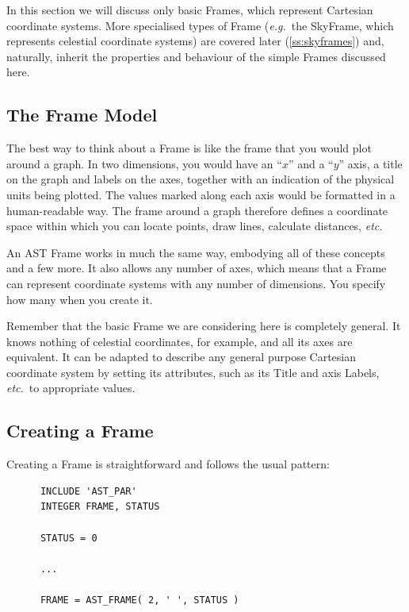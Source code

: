 \documentclass[twoside,11pt]{article}
\newcommand{\htmlref}[2]{#1}
\newcommand{\secref}[1]{\S\ref{#1}}
\renewcommand{\secref}[1]{\ref{#1}}
\begin{document}
In this section we will discuss only basic Frames, which represent
Cartesian coordinate systems. More specialised types of Frame
({\em{e.g.}}\ the \htmlref{SkyFrame}{SkyFrame}, which represents celestial coordinate
systems) are covered later (\secref{ss:skyframes}) and, naturally,
inherit the properties and behaviour of the simple Frames discussed
here.

\subsection{The Frame Model}

The best way to think about a \htmlref{Frame}{Frame} is like the frame that you would
plot around a graph. In two dimensions, you would have an ``$x$'' and
a ``$y$'' axis, a title on the graph and labels on the axes, together
with an indication of the physical units being plotted. The values
marked along each axis would be formatted in a human-readable way. The
frame around a graph therefore defines a coordinate space within which
you can locate points, draw lines, calculate distances, {\em{etc.}}

An AST Frame works in much the same way, embodying all of these
concepts and a few more. It also allows any number of axes, which
means that a Frame can represent coordinate systems with any number of
dimensions. You specify how many when you create it.

Remember that the basic Frame we are considering here is completely
general.  It knows nothing of celestial coordinates, for example, and
all its axes are equivalent. It can be adapted to describe any general
purpose Cartesian coordinate system by setting its attributes, such as
its \htmlref{Title}{Title} and axis Labels, {\em{etc.}}\ to appropriate values.

\subsection{\label{ss:creatingframes}Creating a Frame}

Creating a \htmlref{Frame}{Frame} is straightforward and follows the usual pattern:

\small
\begin{verbatim}
      INCLUDE 'AST_PAR'
      INTEGER FRAME, STATUS

      STATUS = 0

      ...

      FRAME = AST_FRAME( 2, ' ', STATUS )
\end{verbatim}
\normalsize
\end{document}
